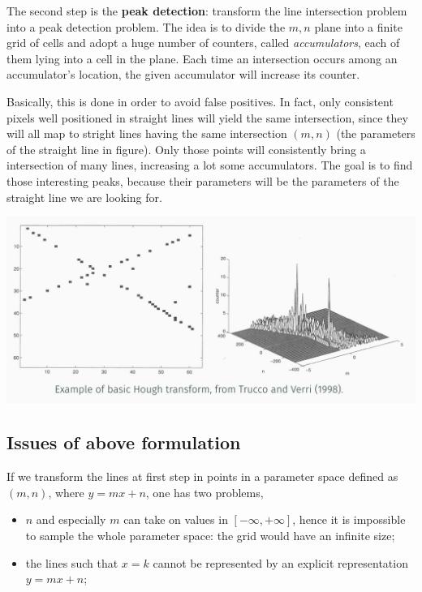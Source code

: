 \documentclass[10pt]{report}
\begin{document}
The second step is the \textbf{peak detection}: transform the line intersection
problem into a peak detection problem. The idea is to divide the \(m,n\)
plane into a finite grid of cells and adopt a huge number of counters,
called \emph{accumulators}, each of them lying into a cell in the plane. Each
time an intersection occurs among an accumulator's location, the given
accumulator will increase its counter.

Basically, this is done in order to avoid false positives. In fact, only
consistent pixels well positioned in straight lines will yield the same
intersection, since they will all map to stright lines having the same
intersection \((m,n)\) (the parameters of the straight line in figure).
Only those points will consistently bring a intersection of many lines,
increasing a lot some accumulators. The goal is to find those
interesting peaks, because their parameters will be the parameters of
the straight line we are looking for.

\begin{center}
\includegraphics[width=.9\linewidth]{./pics/fit/hough-peak-detection.jpg}
\end{center}

\subsection{Issues of above formulation}
\label{possible-issues-of-above-formulation}
If we transform the lines at first step in points in a parameter space
defined as \((m,n)\), where \(y = mx + n\), one has two problems,

\begin{itemize}
\item \(n\) and especially \(m\) can take on values in
\([-\infty, +\infty]\), hence it is impossible to sample the whole
parameter space: the grid would have an infinite size;
\item the lines such that \(x = k\) cannot be represented by an explicit
representation \(y = mx + n\);
\end{itemize}
\end{document}
